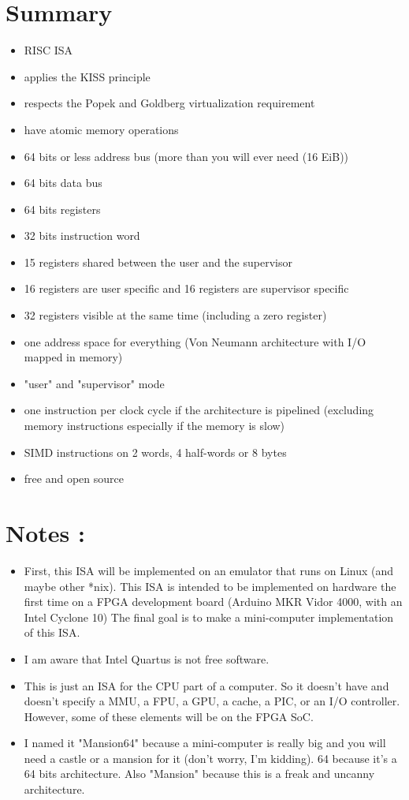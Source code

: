 \documentclass[12pt]{article}
\begin{document}
\section{Summary}
\begin{itemize}
    \item RISC ISA
    \item applies the KISS principle
    \item respects the Popek and Goldberg virtualization requirement
    \item have atomic memory operations
    \item 64 bits or less address bus (more than you will ever need (16 EiB))
    \item 64 bits data bus
    \item 64 bits registers
    \item 32 bits instruction word
    \item 15 registers shared between the user and the supervisor
    \item 16 registers are user specific and 16 registers are supervisor specific 
    \item 32 registers visible at the same time (including a zero register)
    \item one address space for everything (Von Neumann architecture with I/O mapped in memory)
    \item "user" and "supervisor" mode
    \item one instruction per clock cycle if the architecture is pipelined    
	   (excluding memory instructions especially if the memory is slow)
    \item SIMD instructions on 2 words, 4 half-words or 8 bytes
    \item free and open source
\end{itemize}
\section{Notes :}
\begin{itemize}
    \item First, this ISA will be implemented on an emulator that runs on Linux
        (and maybe other *nix). This ISA is intended to be implemented on
        hardware the first time on a FPGA development board (Arduino MKR Vidor
        4000, with an Intel Cyclone 10) The final goal is to make a
        mini-computer implementation of this ISA.

    \item I am aware that Intel Quartus is not free software.

    \item This is just an ISA for the CPU part of a computer. So it doesn't
        have and doesn't specify a MMU, a FPU, a GPU, a cache, a PIC, or an I/O
        controller. However, some of these elements will be on the FPGA SoC.

    \item I named it "Mansion64" because a mini-computer is really big and you
        will need a castle or a mansion for it (don't worry, I'm kidding). 64
        because it's a 64 bits architecture. Also "Mansion" because this is a
        freak and uncanny architecture.

\end{itemize}
\end{document}
